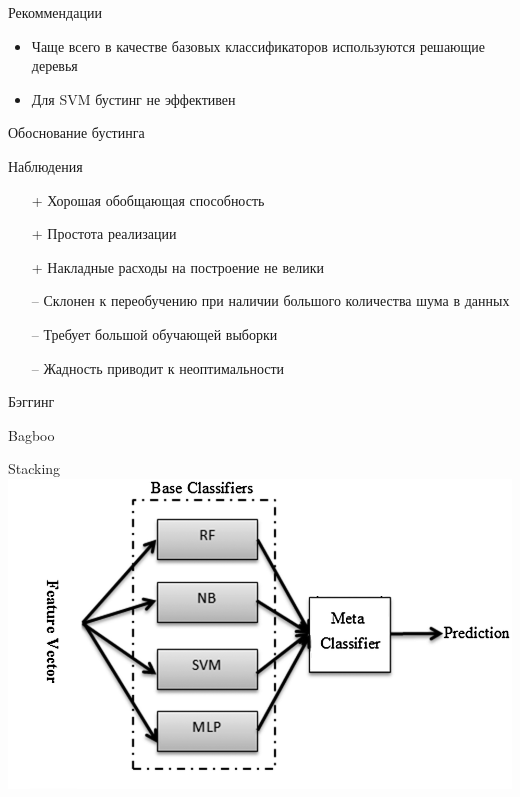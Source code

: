 \documentclass[10pt]{beamer}
\begin{document}
\begin{frame}{Рекоммендации}
  \begin{itemize}
    \item Чаще всего в качестве базовых классификаторов используются решающие деревья
    \item Для SVM бустинг не эффективен     
  \end{itemize}
\end{frame}

\begin{frame}{Обоснование бустинга}
    
\end{frame}

\begin{frame}{Наблюдения}
  \begin{itemize}[<+->]
    \item[+] Хорошая обобщающая способность
    \item[+] Простота реализации
    \item[+] Накладные расходы на построение не велики
    \bigbreak
    \item[--] Склонен к переобучению при наличии большого количества шума в данных
    \item[--] Требует большой обучающей выборки
    \item[--] Жадность приводит к неоптимальности
    
  \end{itemize}
\end{frame}

\begin{frame}{Бэггинг}
    
\end{frame}

\begin{frame}{Bagboo}
    
\end{frame}

\begin{frame}{Stacking}
    \centering
    \includegraphics[width=0.9 \textwidth, keepaspectratio]{images/stacking}
\end{frame}
\end{document}
